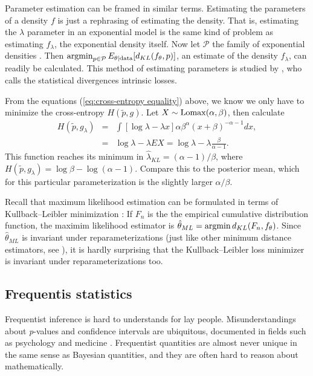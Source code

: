 \begin{example}
Parameter estimation can be framed in similar terms. Estimating the
parameters of a density $f$ is just a rephrasing of estimating the
density. That is, estimating the $\lambda$ parameter in an
exponential model is the same kind of problem as estimating $f_{\lambda}$,
the exponential density itself. Now let $\mathcal{P}$ the family
of exponential densities . Then $\operatorname{argmin}_{p\in\mathcal{P}}E_{\theta\mid\textrm{data}}[d_{KL}(f_{\theta},p)]$,
an estimate of the density $f_{\lambda}$, can readily be calculated.
This method of estimating parameters is studied by \textcite{Robert1996-ii},
who calls the statistical divergences intrinsic losses. 

From the equations (\ref{eq:cross-entropy equality}) above, we know
we only have to minimize the cross-entropy $H(\tilde{p},g)$. Let
$X\sim\operatorname{Lomax}(\alpha,\beta)$, then calculate
\begin{eqnarray*}
H(\tilde{p},g_{\lambda}) & = & \int[\log\lambda-\lambda x]\alpha\beta^{\alpha}(x+\beta)^{-\alpha-1}dx,\\
 & = & \log\lambda-\lambda EX=\log\lambda-\lambda\frac{\beta}{\alpha-1}.
\end{eqnarray*}
This function reaches its minimum in $\hat{\lambda}_{KL}=(\alpha-1)/\beta$,
where $H(\tilde{p},g_{\lambda})=\log\beta-\log(\alpha-1)$. Compare
this to the posterior mean, which for this particular parameterization
is the slightly larger $\alpha/\beta$. 

Recall that maximum likelihood estimation can be formulated in terms
of Kullback--Leibler minimization \parencite[p. 25]{Claeskens2008-hk}:
If $F_{n}$ is the the empirical cumulative distribution function,
the maximim likelihood estimator is $\hat{\theta}_{ML}=\operatorname{argmin} d_{KL}(F_{n},f_{\theta})$.
Since $\hat{\theta}_{ML}$ is invariant under reparameterizations
(just like other minimum distance estimators, see \textcite{Drossos1980-ar}),
it is hardly surprising that the Kullback--Leibler loss minimizer
is invariant under reparameterizations too. 
\end{example}


\subsection{Frequentis statistics}

Frequentist inference is hard to understands for lay people. Misunderstandings
about \emph{p}-values and confidence intervals are ubiquitous, documented
in fields such as psychology 
and medicine . Frequentist quantities are almost never unique in the same
sense as Bayesian quantities, and they are often hard to reason about
mathematically. 

